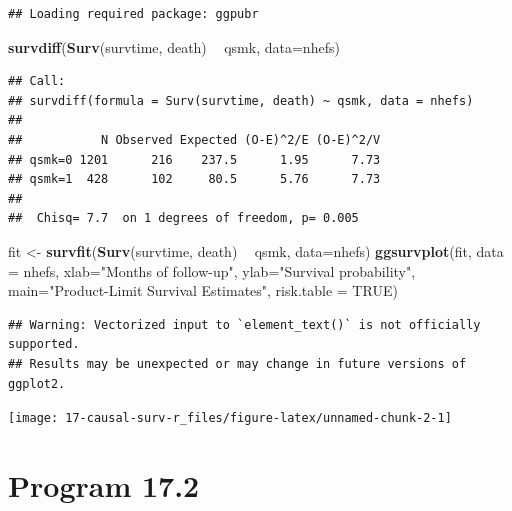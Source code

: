 \documentclass[
  10pt,
]{book}
\newenvironment{Shaded}{\begin{snugshade}}{\end{snugshade}}
\newcommand{\DataTypeTok}[1]{\textcolor[rgb]{0.13,0.29,0.53}{#1}}
\newcommand{\KeywordTok}[1]{\textcolor[rgb]{0.13,0.29,0.53}{\textbf{#1}}}
\newcommand{\NormalTok}[1]{#1}
\newcommand{\OperatorTok}[1]{\textcolor[rgb]{0.81,0.36,0.00}{\textbf{#1}}}
\newcommand{\OtherTok}[1]{\textcolor[rgb]{0.56,0.35,0.01}{#1}}
\newcommand{\StringTok}[1]{\textcolor[rgb]{0.31,0.60,0.02}{#1}}
\begin{document}
\begin{verbatim}
## Loading required package: ggpubr
\end{verbatim}

\begin{Shaded}
\begin{Highlighting}[]
\KeywordTok{survdiff}\NormalTok{(}\KeywordTok{Surv}\NormalTok{(survtime, death) }\OperatorTok{~}\StringTok{ }\NormalTok{qsmk, }\DataTypeTok{data=}\NormalTok{nhefs)}
\end{Highlighting}
\end{Shaded}

\begin{verbatim}
## Call:
## survdiff(formula = Surv(survtime, death) ~ qsmk, data = nhefs)
## 
##           N Observed Expected (O-E)^2/E (O-E)^2/V
## qsmk=0 1201      216    237.5      1.95      7.73
## qsmk=1  428      102     80.5      5.76      7.73
## 
##  Chisq= 7.7  on 1 degrees of freedom, p= 0.005
\end{verbatim}

\begin{Shaded}
\begin{Highlighting}[]
\NormalTok{fit <-}\StringTok{ }\KeywordTok{survfit}\NormalTok{(}\KeywordTok{Surv}\NormalTok{(survtime, death) }\OperatorTok{~}\StringTok{ }\NormalTok{qsmk, }\DataTypeTok{data=}\NormalTok{nhefs)}
\KeywordTok{ggsurvplot}\NormalTok{(fit, }\DataTypeTok{data =}\NormalTok{ nhefs, }\DataTypeTok{xlab=}\StringTok{"Months of follow-up"}\NormalTok{,}
           \DataTypeTok{ylab=}\StringTok{"Survival probability"}\NormalTok{,}
           \DataTypeTok{main=}\StringTok{"Product-Limit Survival Estimates"}\NormalTok{, }\DataTypeTok{risk.table =} \OtherTok{TRUE}\NormalTok{)}
\end{Highlighting}
\end{Shaded}

\begin{verbatim}
## Warning: Vectorized input to `element_text()` is not officially supported.
## Results may be unexpected or may change in future versions of ggplot2.
\end{verbatim}

\begin{center}\texttt{[image: 17-causal-surv-r\_files/figure-latex/unnamed-chunk-2-1]} \end{center}

\hypertarget{program-17.2}{%
\section{Program 17.2}\label{program-17.2}}
\end{document}
